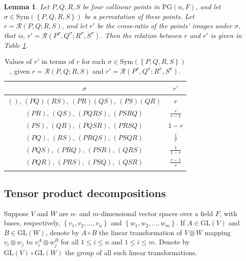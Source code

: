 \documentclass[10pt]{amsart}
\theoremstyle{definition}
\theoremstyle{plain}
\newtheorem{lemma}[lemma]{Lemma}
\theoremstyle{plain}
\theoremstyle{plain}
\theoremstyle{plain}
\newcommand{\GL}{\mathrm{GL}}
\newcommand{\PG}{\mathrm{PG}}
\newcommand{\Sym}{\mathrm{Sym}}
\begin{document}
\begin{lemma} \label{lm:permute-cross-ratio}
Let $P, Q, R, S$ be four collinear points in $\PG{\left(n, F \right)}$, and let $\sigma \in \Sym{\left(\left\{P, Q, R, S \right\}\right)}$ be a permutation of these points. Let $r = \mathcal{R}{\left(P, Q; R, S \right)}$, and let $r'$ be the cross-ratio of the points' images under $\sigma$, that is, $r' = \mathcal{R}{\left(P^\sigma, Q^\sigma; R^\sigma, S^\sigma \right)}$. Then the relation between $r$ and $r'$ is given in Table \ref{tbl:permuted-cross-ratios}.
\end{lemma}

\begin{table}
\renewcommand*{\arraystretch}{1.6}
\centering
\begin{tabular}{cc}
\hline
$\sigma$ & $r'$ \\
\hline
$\left(\right)$, ${\left(PQ \right)} {\left(RS \right)}$, ${\left(PR \right)} {\left(QS \right)}$, ${\left(PS \right)} {\left(QR \right)}$ & $r$ \\
$\left(PR \right)$, $\left(QS \right)$, $\left(PQRS \right)$, $\left(PSRQ \right)$ & $\frac{r}{r-1}$ \\
$\left(PS \right)$, $\left(QR \right)$, $\left(PQSR \right)$, $\left(PRSQ \right)$ & $1-r$ \\
$\left(PQ \right)$, $\left(RS \right)$, $\left(PRQS \right)$, $\left(PSQR \right)$ & $\frac{1}{r}$ \\
$\left(PQS \right)$, $\left(PRQ \right)$, $\left(PSR \right)$, $\left(QRS \right)$ & $\frac{1}{1-r}$ \\
$\left(PQR \right)$, $\left(PRS \right)$, $\left(PSQ \right)$, $\left(QSR \right)$ & $\frac{r-1}{r}$ \\
\hline \\
\end{tabular}
\caption{Values of $r'$ in terms of $r$ for each $\sigma \in \Sym{\left(\left\{P, Q, R, S \right\}\right)}$, given $r = \mathcal{R}{\left(P, Q; R, S \right)}$ and $r' = \mathcal{R}{\left(P^\sigma, Q^\sigma; R^\sigma, S^\sigma \right)}$.}
\label{tbl:permuted-cross-ratios}
\end{table}

\subsection{Tensor product decompositions}

Suppose $V$ and $W$ are $n$- and $m$-dimensional vector spaces over a field $F$, with bases, respectively, $\left\{v_1, v_2, \ldots, v_n \right\}$ and $\left\{w_1, w_2, \ldots, w_m \right\}$. If $A \in \GL{\left(V \right)}$ and $B \in \GL{\left(W \right)}$, denote by $A \circ B$ the linear transformation of $V \otimes W$ mapping $v_i \otimes w_j$ to $v_i^A \otimes w_j^B$ for all $1 \leqslant i \leqslant n$ and $1 \leqslant i \leqslant m$. Denote by $\GL{\left(V \right)} \circ \GL{\left(W \right)}$ the group of all such linear transformations.
\end{document}
